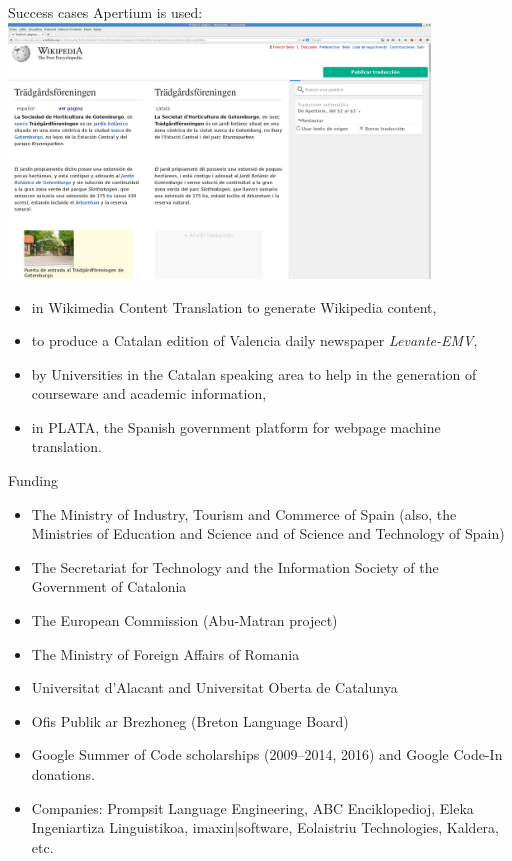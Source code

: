 \documentclass[final]{beamer} %
\newlength{\wideitemsep}
\let\olditem\item
\renewcommand{\item}{\setlength{\itemsep}{\wideitemsep}\olditem}
\begin{document}
\begin{frame}
\begin{columns}
\begin{column}{1\textwidth}
\begin{block}{Success cases}
Apertium is used:
\flushright	
\includegraphics[width=0.84\textwidth]{Images/captura-mediawiki.png}
\flushleft
\begin{itemize}
\item in Wikimedia Content Translation to generate Wikipedia content,
\item to produce a Catalan edition of Valencia daily newspaper \textit{Levante-EMV},
\item by Universities in the Catalan speaking area to help in the generation of courseware and academic information,
\item in PLATA, the Spanish government platform for webpage machine translation.
\end{itemize}
\end{block}

\begin{block}{Funding}
\begin{itemize}
\item The Ministry of Industry, Tourism and Commerce of Spain (also,
  the Ministries of Education and Science and of Science
  and Technology of Spain)
\item The Secretariat for Technology and the Information Society of the Government of Catalonia
\item The European Commission (Abu-Matran project)
\item The Ministry of Foreign Affairs of Romania
\item Universitat d'Alacant and Universitat Oberta de Catalunya
\item Ofis Publik ar Brezhoneg (Breton Language Board)
\item Google Summer of Code scholarships (2009--2014, 2016) and Google Code-In donations.
\item Companies: Prompsit Language Engineering, ABC Enciklopedioj, Eleka Ingeniartiza Linguistikoa, imaxin|software, Eolaistriu Technologies, Kaldera, etc.

\end{itemize} 
\end{block}


\end{column}
\end{columns}
\end{frame}
\end{document}
